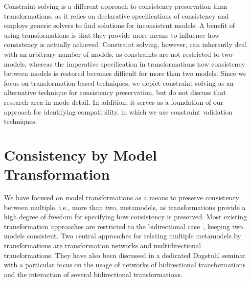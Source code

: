 Constraint solving is a different approach to consistency preservation than transformations, as it relies on declarative specifications of consistency and employs generic solvers to find solutions for inconsistent models.
A benefit of using transformations is that they provide more means to influence how consistency is actually achieved.
Constraint solving, however, can inherently deal with an arbitrary number of models, as constraints are not restricted to two models, whereas the imperative specification in transformations how consistency between models is restored becomes difficult for more than two models.
Since we focus on transformation-based techniques, we depict constraint solving as an alternative technique for consistency preservation, but do not discuss that research area in mode detail.
In addition, it serves as a foundation of our approach for identifying compatibility, in which we use constraint validation techniques.



\section{Consistency by Model Transformation}

We have focused on model transformations as a means to preserve consistency between multiple, i.e., more than two, metamodels, as transformations provide a high degree of freedom for specifying how consistency is preserved.
Most existing transformation approaches are restricted to the bidirectional case~\cite{weidmann2020ApplyingBidirectionalTransformations-WSRE, cleve2019dagstuhl}, keeping two models consistent.
Two central approaches for relating multiple metamodels by transformations are transformation networks and multidirectional transformations.
They have also been discussed in a dedicated Dagstuhl seminar~\cite{cleve2019dagstuhl} with a particular focus on the usage of networks of bidirectional transformations and the interaction of several bidirectional transformations.

